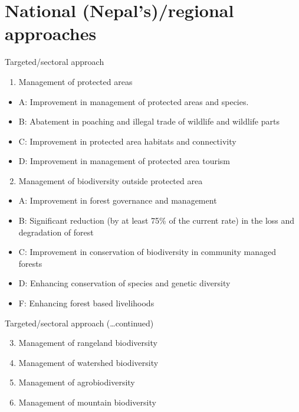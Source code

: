 \documentclass[
  ignorenonframetext,
  aspectratio=169]{beamer}
\providecommand{\tightlist}{%
  \setlength{\itemsep}{0pt}\setlength{\parskip}{0pt}}
\begin{document}
\hypertarget{national-nepalsregional-approaches}{%
\section{National (Nepal's)/regional
approaches}\label{national-nepalsregional-approaches}}

\begin{frame}{Targeted/sectoral approach}
\protect\hypertarget{targetedsectoral-approach}{}
\begin{enumerate}
\tightlist
\item
  Management of protected areas
\end{enumerate}

\begin{itemize}
\tightlist
\item
  A: Improvement in management of protected areas and species.
\item
  B: Abatement in poaching and illegal trade of wildlife and wildlife
  parts
\item
  C: Improvement in protected area habitats and connectivity
\item
  D: Improvement in management of protected area tourism
\end{itemize}

\begin{enumerate}
\setcounter{enumi}{1}
\tightlist
\item
  Management of biodiversity outside protected area
\end{enumerate}

\begin{itemize}
\tightlist
\item
  A: Improvement in forest governance and management
\item
  B: Significant reduction (by at least 75\% of the current rate) in the
  loss and degradation of forest
\item
  C: Improvement in conservation of biodiversity in community managed
  forests
\item
  D: Enhancing conservation of species and genetic diversity
\item
  F: Enhancing forest based livelihoods
\end{itemize}
\end{frame}

\begin{frame}{Targeted/sectoral approach (\ldots continued)}
\protect\hypertarget{targetedsectoral-approach-continued}{}
\begin{enumerate}
\setcounter{enumi}{2}
\tightlist
\item
  Management of rangeland biodiversity
\item
  Management of watershed biodiversity
\item
  Management of agrobiodiversity
\item
  Management of mountain biodiversity
\end{enumerate}
\end{frame}
\end{document}
